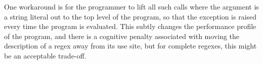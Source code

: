 \begin{enumerate}
One workaround is for the programmer to lift all such calls where the argument is a string literal out to the top level of the program, so that the exception is raised every time the program is evaluated. This subtly changes the performance profile of the program, and there is a cognitive penalty associated with moving the description of a regex away from its use site, but for complete regexes, this might be an acceptable trade-off.%





\end{enumerate}
